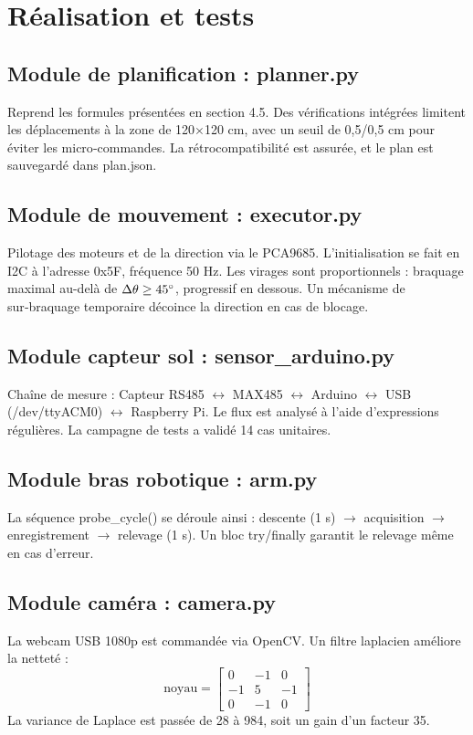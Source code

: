 \documentclass[a4paper,12pt,openany,titlepage]{scrartcl}
\begin{document}
\newpage

\section{R\'ealisation et tests}

\subsection{Module de planification : planner.py}
Reprend les formules présentées en section 4.5. Des vérifications intégrées limitent les déplacements à la zone de 120$\times$120 cm, avec un seuil de 0,5\degree/0,5 cm pour éviter les micro‑commandes. La rétrocompatibilité est assurée, et le plan est sauvegardé dans plan.json.

\subsection{Module de mouvement : executor.py}
Pilotage des moteurs et de la direction via le PCA9685. L’initialisation se fait en I2C à l’adresse 0x5F, fréquence 50 Hz. Les virages sont proportionnels : braquage maximal au-delà de $\Delta\theta \geq 45\degree$, progressif en dessous. Un mécanisme de sur‑braquage temporaire décoince la direction en cas de blocage.

\subsection{Module capteur sol : sensor\_arduino.py}
Chaîne de mesure : Capteur RS485 $\leftrightarrow$ MAX485 $\leftrightarrow$ Arduino $\leftrightarrow$ USB (/dev/ttyACM0) $\leftrightarrow$ Raspberry Pi. Le flux est analysé à l’aide d’expressions régulières. La campagne de tests a validé 14 cas unitaires.

\subsection{Module bras robotique : arm.py}
La séquence probe\_cycle() se déroule ainsi : descente (1 s) $\rightarrow$ acquisition $\rightarrow$ enregistrement $\rightarrow$ relevage (1 s). Un bloc try/finally garantit le relevage même en cas d’erreur.

\subsection{Module caméra : camera.py}
La webcam USB 1080p est commandée via OpenCV. Un filtre laplacien améliore la netteté :
\begin{equation}
\text{noyau} = \begin{bmatrix} 0 & -1 & 0 \\ -1 & 5 & -1 \\ 0 & -1 & 0 \end{bmatrix}
\end{equation}
La variance de Laplace est passée de 28 à 984, soit un gain d’un facteur 35.
\end{document}
